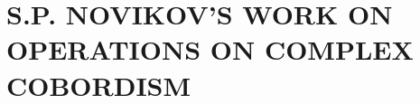 \documentclass[../main]{subfiles}
\begin{document}
\part{S.P. NOVIKOV'S WORK ON OPERATIONS ON COMPLEX COBORDISM}









\end{document}
